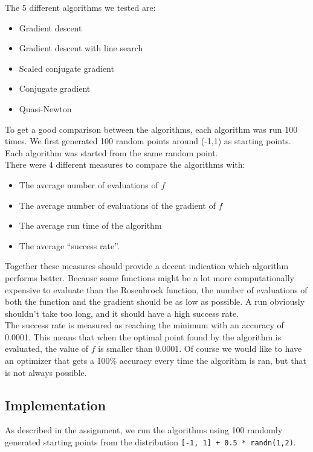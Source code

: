 \documentclass{article}
\begin{document}
The 5 different algorithms we tested are:
\begin{itemize}
\item Gradient descent
\item Gradient descent with line search
\item Scaled conjugate gradient
\item Conjugate gradient
\item Quasi-Newton
\end{itemize}

To get a good comparison between the algorithms, each algorithm was run 100 times.
We first generated 100 random points around (-1,1) as starting points. Each algorithm was started from the same random point.\\

There were 4 different measures to compare the algorithms with:
\begin{itemize}
\item The average number of evaluations of $f$
\item The average number of evaluations of the gradient of $f$
\item The average run time of the algorithm
\item The average ``success rate''. 
\end{itemize}

Together these measures should provide a decent indication which algorithm performs better. Because some functions might be a lot more computationally expensive to evaluate than the Rosenbrock function, the number of evaluations of both the function and the gradient should be as low as possible. A run obviously shouldn't take too long, and it should have a high success rate. \\

The success rate is measured as reaching the minimum with an accuracy of 0.0001. This means that when the optimal point found by the algorithm is evaluated, the value of $f$ is smaller than 0.0001. Of course we would like to have an optimizer that gets a 100\% accuracy every time the algorithm is ran, but that is not always possible. 

\subsection{Implementation}
As described in the assignment, we run the algorithms using 100 randomly generated starting points from the distribution \texttt{[-1, 1] + 0.5 * randn(1,2)}. 
\end{document}

